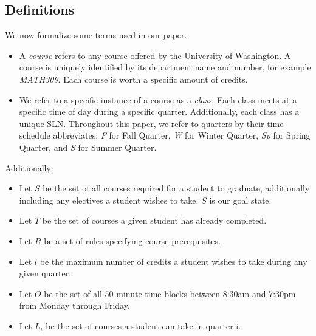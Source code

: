 \documentclass[11pt]{article} %
\begin{document}
\subsection{Definitions} We now formalize some terms used in our paper.
\begin{itemize} \item A {\it course} refers to any course offered by the
University of Washington.  A course is uniquely identified by its department name and
number, for example {\it MATH309}.  Each course is worth a specific amount
of credits.  \item We refer to a specific instance of a course as a {\it class}.
Each class meets at a specific time of day during a specific quarter.  Additionally,
each class has a unique SLN.  Throughout
this paper, we refer to quarters by their time schedule abbreviates: {\it
F} for Fall Quarter, {\it W} for Winter Quarter, {\it Sp} for Spring Quarter,
and {\it S} for Summer Quarter.  \end{itemize}

Additionally: \begin{itemize} \item Let $S$ be the set of all courses required for
a student to graduate, additionally including any electives a student wishes to take.
$S$ is our goal state.  \item Let $T$ be the set of courses
a given student has already completed.
\item Let $R$ be a set of rules specifying course prerequisites.
\item Let $l$ be the maximum number of credits a student wishes to take during
any given quarter.  \item Let $O$ be the set of all 50-minute time blocks
between 8:30am and 7:30pm from Monday through Friday.  \item Let $L_i$ be the set
of courses a student can take in quarter i.  \end{itemize}
\end{document}
